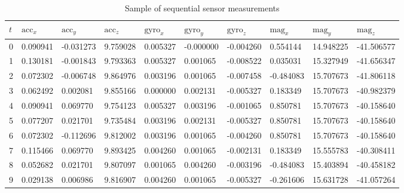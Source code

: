 \documentclass[12pt, titlepage]{article}
\begin{document}
\begin{landscape}
\begin{table}[]
    \centering
    \caption{Sample of sequential sensor measurements}
    \label{tab:gt_data}
    \begin{tabular}{|l||l|l|l|l|l|l|l|l|l|}
    \hline
    {$t$} & {$\text{acc}_x$} & {$\text{acc}_y$} & {$\text{acc}_z$} & {$\text{gyro}_x$} &
    {$\text{gyro}_y$} & {$\text{gyro}_z$} & {$\text{mag}_x$} & {$\text{mag}_y$} & {$\text{mag}_z$}
    \\ \hline \hline
    0 & 0.090941 & -0.031273 & 9.759028 & 0.005327 & -0.000000 & -0.004260 & 0.554144  & 14.948225 &
    -41.506577 \\ \hline
    1 & 0.130181 & -0.001843 & 9.793363 & 0.005327 & 0.001065  & -0.008522 & 0.035031  & 15.327949 &
    -41.656347 \\ \hline
    2 & 0.072302 & -0.006748 & 9.864976 & 0.003196 & 0.001065  & -0.007458 & -0.484083 & 15.707673 &
    -41.806118 \\ \hline
    3 & 0.062492 & 0.002081  & 9.855166 & 0.000000 & 0.002131  & -0.005327 & 0.183349  & 15.707673 &
    -40.982379 \\ \hline
    4 & 0.090941 & 0.069770  & 9.754123 & 0.005327 & 0.003196  & -0.001065 & 0.850781  & 15.707673 &
    -40.158640 \\ \hline
    5 & 0.077207 & 0.021701  & 9.735484 & 0.003196 & 0.002131  & -0.005327 & 0.850781  & 15.707673 &
    -40.158640 \\ \hline
    6 & 0.072302 & -0.112696 & 9.812002 & 0.003196 & 0.001065  & -0.004260 & 0.850781  & 15.707673 &
    -40.158640 \\ \hline
    7 & 0.115466 & 0.069770  & 9.893425 & 0.004260 & 0.001065  & -0.002131 & 0.183349  & 15.555783 &
    -40.308411 \\ \hline
    8 & 0.052682 & 0.021701  & 9.807097 & 0.001065 & 0.004260  & -0.003196 & -0.484083 & 15.403894 &
    -40.458182 \\ \hline
    9 & 0.029138 & 0.006986  & 9.816907 & 0.004260 & 0.001065  & -0.005327 & -0.261606 & 15.631728 &
    -41.057264 \\ \hline
    \end{tabular}
    \end{table}
\end{landscape}
\end{document}
